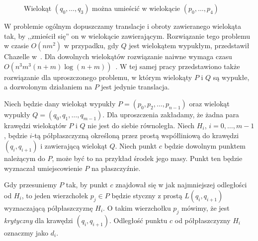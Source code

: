 \begin{figure}[htb]
  \caption{Wielokąt $(q_0, \ldots, q_3)$ można umieścić w wielokącie
    $(p_0, \ldots, p_4)$\label{img:containment1}}
\end{figure}

W problemie ogólnym dopuszczamy translacje i obroty zawieranego
wielokąta tak, by ,,zmieścił się'' on w wielokącie
zawierającym. Rozwiązanie tego problemu w czasie $O(nm^2)$ w
przypadku, gdy $Q$ jest wielokątem wypukłym, przedstawił Chazelle
w~\cite{Chazelle83}. Dla dowolnych wielokątów rozwiązanie naiwne
wymaga czasu $O(n^3m^3(n + m) \log{(n + m)})$~\cite{Chazelle83}. W tej
samej pracy przedstawiono także rozwiązanie dla uproszczonego
problemu, w którym wielokąty $P$ i $Q$ są wypukłe, a dozwolonym
działaniem na $P$ jest jedynie translacja.

Niech będzie dany wielokąt wypukły $P = (p_0, p_2, \ldots, p_{n-1})$
oraz wielokąt wypukły $Q = (q_0, q_1, \ldots, q_{m-1})$. Dla
uproszczenia zakładamy, że żadna para krawędzi wielokątów $P$ i $Q$
nie jest do siebie równoległa. Niech $H_i$, $i = 0, \ldots, m - 1$,
będzie $i$-tą półpłaszczyzną określoną przez prostą współliniową do
krawędzi $(q_i, q_{i+1})$ i zawierającą wielokąt $Q$. Niech punkt $c$
będzie dowolnym punktem należącym do $P$, może być to na przykład
środek jego masy. Punkt ten będzie wyznaczał umiejscowienie $P$ na
płaszczyźnie.

Gdy przesuniemy $P$ tak, by punkt $c$ znajdował się w jak najmniejszej
odległości od $H_i$, to jeden wierzchołek $p_j \in P$ będzie styczny z
prostą $L(q_i, q_{i+1})$ wyznaczającą półpłaszczyznę $H_i$. O takim
wierzchołku $p_j$ mówimy, że jest \emph{krytyczny} dla krawędzi $(q_i,
q_{i+1})$. Odległość punktu $c$ od półpłaszczyzny $H_i$ oznaczmy jako
$d_i$.

